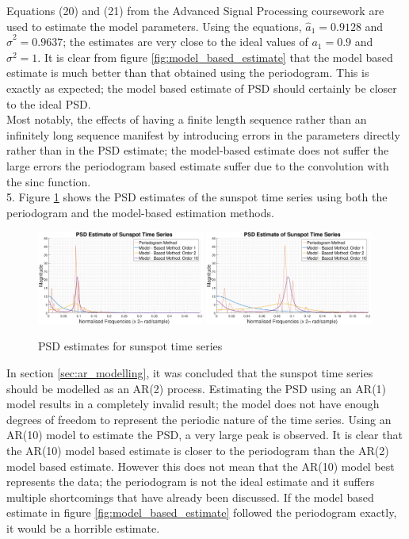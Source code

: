 \documentclass{article}
\begin{document}
Equations (20) and (21) from the Advanced Signal Processing coursework are used to estimate the model parameters. Using the equations, $\hat{a}_{1}=0.9128$ and $\hat{\sigma}^{2} = 0.9637$; the estimates are very close to the ideal values of $a_{1}=0.9$ and $\sigma^{2} = 1$. It is clear from figure \ref{fig:model_based_estimate} that the model based estimate is much better than that obtained using the periodogram. This is exactly as expected; the model based estimate of PSD should certainly be closer to the ideal PSD.\\ 

Most notably, the effects of having a finite length sequence rather than an infinitely long sequence manifest by introducing errors in the parameters directly rather than in the PSD estimate; the model-based estimate does not suffer the large errors the periodogram based estimate suffer due to the convolution with the sinc function.\\

5. Figure \ref{fig:sunspot_psd_estimate} shows the PSD estimates of the sunspot time series using both the periodogram and the model-based estimation methods. 

\begin{figure}[H]
    \centering
    \includegraphics[width=0.49\textwidth]{sunspot_psd_estimates}
    \includegraphics[width=0.49\textwidth]{sunspot_psd_estimates_zoom}
    \caption{PSD estimates for sunspot time series}
    \label{fig:sunspot_psd_estimate}
\end{figure}

In section \ref{sec:ar_modelling}, it was concluded that the sunspot time series should be modelled as an AR(2) process. Estimating the PSD using an AR(1) model results in a completely invalid result; the model does not have enough degrees of freedom to represent the periodic nature of the time series. Using an AR(10) model to estimate the PSD, a very large peak is observed. It is clear that the AR(10) model based estimate is closer to the periodogram than the AR(2) model based estimate. However this does not mean that the AR(10) model best represents the data; the periodogram is not the ideal estimate and it suffers multiple shortcomings that have already been discussed. If the model based estimate in figure \ref{fig:model_based_estimate} followed the periodogram exactly, it would be a horrible estimate.\\ 
\end{document}
